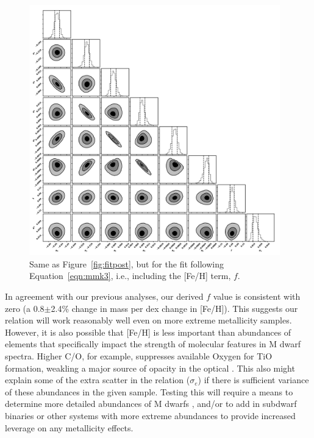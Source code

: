 \documentclass[twocolumn]{aastex62}
\begin{document}
\begin{figure}[p]
\begin{center}
\includegraphics[width=0.97\textwidth]{output_8feh_eMass.pdf}
\caption{Same as Figure~\ref{fig:fitpost}, but for the fit following Equation~\ref{eqn:mmk3}, i.e., including the [Fe/H] term, $f$. }
\label{fig:fitpost_feh}
\end{center}
\end{figure}

In agreement with our previous analyses, our derived $f$ value is consistent with zero (a 0.8$\pm$2.4\% change in mass per dex change in [Fe/H]). This suggests our relation will work reasonably well even on more extreme metallicity samples. However, it is also possible that [Fe/H] is less important than abundances of elements that specifically impact the strength of molecular features in M dwarf spectra. Higher C/O, for example, suppresses available Oxygen for TiO formation, weakling a major source of opacity in the optical \citep[e.g., C, O, Ti,][]{2012ApJ...747L..27F,2015ApJ...804...40G,Veyette2016a}. This also might explain some of the extra scatter in the relation ($\sigma_e$) if there is sufficient variance of these abundances in the given sample. Testing this will require a means to determine more detailed abundances of M dwarfs \citep[e.g.,][]{Veyette2017}, and/or to add in subdwarf binaries or other systems with more extreme abundances to provide increased leverage on any metallicity effects. 
\end{document}
